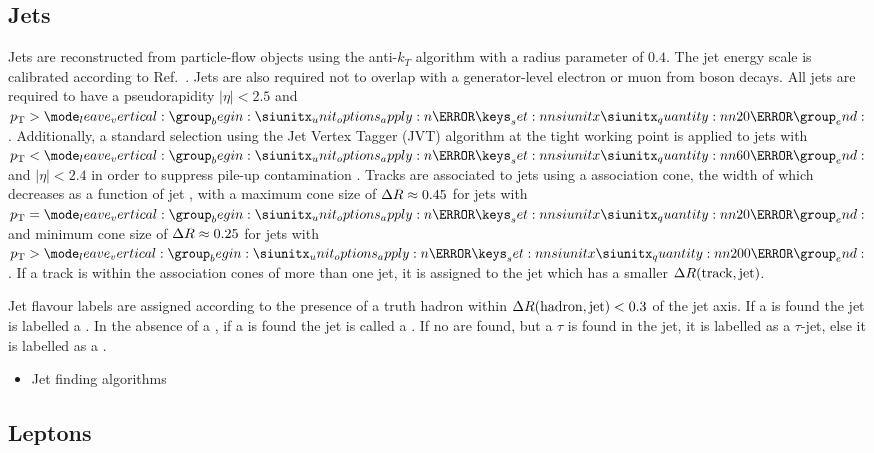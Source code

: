 \subsection{Jets}\label{sec:jets}

Jets are reconstructed from particle-flow objects \cite{PERF-2015-09} using the anti-$k_T$ algorithm \cite{Cacciari:2008gp} with a radius parameter of $0.4$.
The jet energy scale is calibrated according to Ref.~\cite{PERF-2016-04}.
Jets are also required not to overlap with a generator-level electron or muon from \Wboson boson decays.
All jets are required to have a pseudorapidity $|\eta| < 2.5$ and $\pt > \SI{20}{\GeV}$. 
Additionally, a standard selection using the Jet Vertex Tagger (JVT) algorithm at the tight working point is applied to jets with $\pt < \SI{60}{\GeV}$ and $|\eta| < 2.4$ in order to suppress pile-up contamination \cite{ATLAS-CONF-2014-018}.
Tracks are associated to jets using a \DeltaR association cone, the width of which decreases as a function of jet \pt, with a maximum cone size of $\Delta R \approx 0.45$ for jets with $\pt = \SI{20}{\GeV}$ and minimum cone size of $\Delta R \approx 0.25$ for jets with $\pt > \SI{200}{\GeV}$. 
If a track is within the association cones of more than one jet, it is assigned to the jet which has a smaller $\Delta R(\text{track}, \text{jet})$.

Jet flavour labels are assigned according to the presence of a truth hadron within ${\Delta R(\text{hadron},\text{jet})<0.3}$ of the jet axis. If a \bhadron is found the jet is labelled a \bjet. In the absence of a \bhadron, if a \chadron is found the jet is called a \cjet.
If no \borchadrons are found, but a $\tau$ is found in the jet, it is labelled as a $\tau$-jet, else it is labelled as a \ljet.


\begin{itemize}
  \item Jet finding algorithms
\end{itemize}



\subsection{Leptons}\label{sec:leptons}